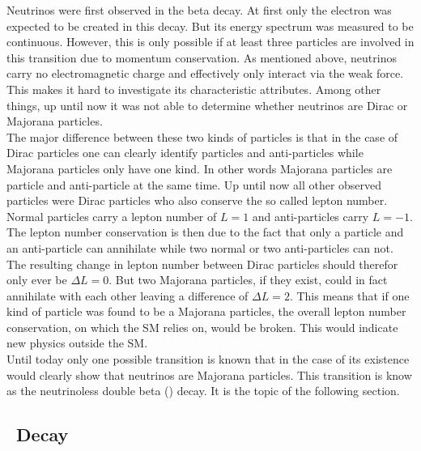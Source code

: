 \documentclass[encoding=utf8,british]{tumphthesis}
\begin{document}
Neutrinos were first observed in the beta decay.
At first only the electron was expected to be created in this decay.
But its energy spectrum was measured to be continuous.
However, this is only possible if at least three particles are involved in this transition due to momentum conservation.
As mentioned above, neutrinos carry no electromagnetic charge and effectively only interact via the weak force.
This makes it hard to investigate its characteristic attributes.
Among other things, up until now it was not able to determine whether neutrinos are Dirac or Majorana particles.
\\

The major difference between these two kinds of particles is that in the case of Dirac particles one can clearly identify particles and anti-particles while Majorana particles only have one kind.
In other words Majorana particles are particle and anti-particle at the same time.
Up until now all other observed particles were Dirac particles who also conserve the so called lepton number.
Normal particles carry a lepton number of $L = 1$ and anti-particles carry $L = -1$.
The lepton number conservation is then due to the fact that only a particle and an anti-particle can annihilate while two normal or two anti-particles can not.
The resulting change in lepton number between Dirac particles should therefor only ever be $\Delta L = 0$.
But two Majorana particles, if they exist, could in fact annihilate with each other leaving a difference of $\Delta L = 2$.
This means that if one kind of particle was found to be a Majorana particles, the overall lepton number conservation, on which the SM relies on, would be broken.
This would indicate new physics outside the SM.
\\

Until today only one possible transition is known that in the case of its existence would clearly show that neutrinos are Majorana particles.
This transition is know as the neutrinoless double beta (\onbb) decay.
It is the topic of the following section.
 



\subsection{\onbb\ Decay}
\label{sec:0nubetabeta}
\end{document}
